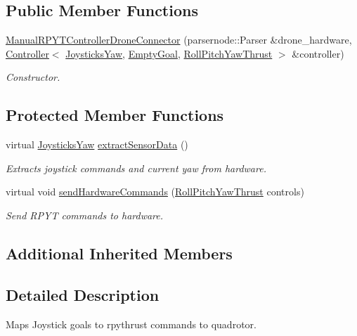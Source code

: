\subsection*{Public Member Functions}
\begin{DoxyCompactItemize}
\item 
\hyperlink{classManualRPYTControllerDroneConnector_a1e9d3f52b19ed5d89b00d6358f826f9b}{Manual\-R\-P\-Y\-T\-Controller\-Drone\-Connector} (parsernode\-::\-Parser \&drone\-\_\-hardware, \hyperlink{classController}{Controller}$<$ \hyperlink{structJoysticksYaw}{Joysticks\-Yaw}, \hyperlink{structEmptyGoal}{Empty\-Goal}, \hyperlink{structRollPitchYawThrust}{Roll\-Pitch\-Yaw\-Thrust} $>$ \&controller)
\begin{DoxyCompactList}\small\item\em Constructor. \end{DoxyCompactList}\end{DoxyCompactItemize}
\subsection*{Protected Member Functions}
\begin{DoxyCompactItemize}
\item 
virtual \hyperlink{structJoysticksYaw}{Joysticks\-Yaw} \hyperlink{classManualRPYTControllerDroneConnector_a6c47447c98dd1528703355f9f60f1d50}{extract\-Sensor\-Data} ()
\begin{DoxyCompactList}\small\item\em Extracts joystick commands and current yaw from hardware. \end{DoxyCompactList}\item 
virtual void \hyperlink{classManualRPYTControllerDroneConnector_a34bde89c4b4f2d0de000b4ccbfc719c4}{send\-Hardware\-Commands} (\hyperlink{structRollPitchYawThrust}{Roll\-Pitch\-Yaw\-Thrust} controls)
\begin{DoxyCompactList}\small\item\em Send R\-P\-Y\-T commands to hardware. \end{DoxyCompactList}\end{DoxyCompactItemize}
\subsection*{Additional Inherited Members}


\subsection{Detailed Description}
Maps Joystick goals to rpythrust commands to quadrotor. 

